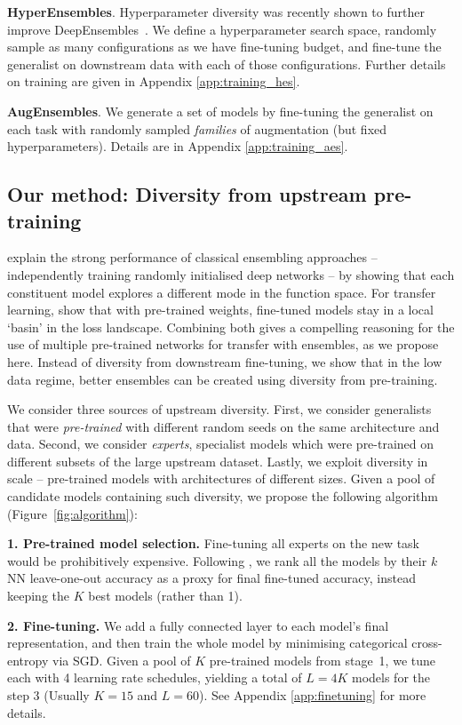 \documentclass{article} \usepackage{iclr2021_conference,times}
\begin{document}
\textbf{HyperEnsembles}.
Hyperparameter diversity was recently shown to further improve DeepEnsembles~\citep{wenzel2020hyperparameter}.
We define a hyperparameter search space, randomly sample as many configurations as we have fine-tuning budget, and fine-tune the generalist on downstream data with each of those configurations. Further details on training are given in Appendix  \ref{app:training_hes}.

\textbf{AugEnsembles}.
We generate a set of models by fine-tuning the generalist on each task with randomly sampled \textit{families} of augmentation (but fixed hyperparameters). Details are in Appendix \ref{app:training_aes}.


\subsection{Our method: Diversity from upstream pre-training}
\citet{fort2019deep} explain the strong performance of classical ensembling approaches -- independently training randomly initialised deep networks -- by showing that each constituent model explores a different mode in the function space.
For transfer learning, \citet{neyshabur2020transferred} show that with pre-trained weights, fine-tuned models stay in a local `basin' in the loss landscape. Combining both gives a compelling reasoning for the use of multiple pre-trained networks for transfer with ensembles, as we propose here. Instead of diversity from downstream fine-tuning, we show that in the low data regime, better ensembles can be created using diversity from pre-training.

We consider three sources of upstream diversity.
First, we consider generalists that were \textit{pre-trained} with different random seeds on the same architecture and data.
Second, we consider \textit{experts}, specialist models which were pre-trained on different subsets of the 
large upstream dataset.
Lastly, we exploit diversity in scale -- pre-trained models with architectures of different sizes.
Given a pool of candidate models containing such diversity, we propose the following algorithm (Figure~\ref{fig:algorithm}):

\textbf{1. Pre-trained model selection.}
Fine-tuning all experts on the new task would be prohibitively expensive. Following \citet{puigcerver2020experts}, we rank all the models by their $k$NN leave-one-out accuracy as a proxy for final fine-tuned accuracy, instead keeping the $K$ best models (rather than 1).

\textbf{2. Fine-tuning.}
We add a fully connected layer to each model's final representation, and then train the whole model by minimising categorical cross-entropy via SGD.
Given a pool of $K$ pre-trained models from stage~1, we tune each with 4 learning rate schedules, yielding a total of $L = 4K$ models for the step 3 (Usually $K=15$ and $L=60$). See Appendix \ref{app:finetuning} for more details.
\end{document}
